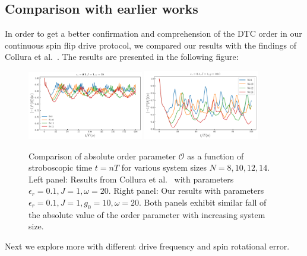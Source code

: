 \documentclass[a4paper, 11pt]{article}
\begin{document}
\subsection{Comparison with earlier works}
In order to get a better confirmation and comprehension of the DTC order in our continuous spin flip drive protocol, we compared our results with the findings of Collura et al.~\cite{Collura2023}. The results are presented in the following figure:
\begin{figure}[h!]
    \centering
    \includegraphics[width=0.45\textwidth]{figs/Collura_orderParam_er0.1_J1_g12.500000000000004.pdf}
    \includegraphics[width=0.45\textwidth]{figs/order_er0.1_J1_g10.0.pdf}
    \caption{Comparison of absolute order parameter $\mathcal{O}$ as a function of stroboscopic time $t=nT$ for various system sizes $N=8,10,12,14$. Left panel: Results from Collura et al.~\cite{Collura2023} with parameters $\epsilon_r = 0.1, J = 1, \omega = 20$. Right panel: Our results with parameters $\epsilon_r = 0.1, J = 1, g_0 = 10, \omega = 20$. Both panels exhibit similar fall of the absolute value of the order parameter with increasing system size.}
\end{figure}
Next we explore more with different drive frequency and spin rotational error.
\end{document}
